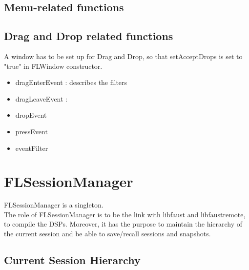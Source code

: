 \documentclass[a4paper]{article}
\begin{document}
\subsection{Menu-related functions}



\subsection{Drag and Drop related functions}

A window has to be set up for Drag and Drop, so that setAcceptDrops is set to "true" in FLWindow constructor.

\begin{itemize}
\item dragEnterEvent : describes the filters 
\item dragLeaveEvent : 
\item dropEvent
\item pressEvent
\item eventFilter
\end{itemize}

\section{FLSessionManager}

FLSessionManager is a singleton.\\

The role of FLSessionManager is to be the link with libfaust and libfaustremote, to compile the DSPs. Moreover, it has the purpose to maintain the hierarchy of the current session and be able to save/recall sessions and snapshots. 

\subsection{Current Session Hierarchy}
\end{document}
